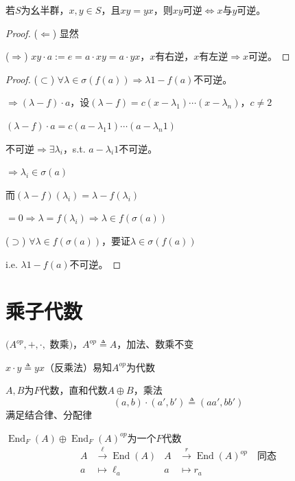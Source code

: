\documentclass[lang=cn,a4paper,newtx,section]{elegantbook}
\begin{document}
\begin{remark}
  若$S$为幺半群，$x, y \in S$，且$xy = yx$，则$xy$可逆$\Longleftrightarrow x$与$y$可逆。
\end{remark}

\begin{proof}
  ($\Leftarrow$) 显然
  
  ($\Rightarrow$) $xy \cdot a := e = a \cdot xy = a \cdot yx$，$x$有右逆，$x$有左逆$\Rightarrow x$可逆。
\end{proof}

\begin{proof}
  ($\subset$) $\forall \lambda \in \sigma(f(a)) \Rightarrow \lambda 1 - f(a)$不可逆。
  
  $\Rightarrow (\lambda - f) \cdot a$，设$(\lambda - f) = c(x - \lambda_1) \cdots (x - \lambda_n)$，$c \neq 2$
  
  $(\lambda - f) \cdot a = c(a - \lambda_1 1) \cdots (a - \lambda_n 1)$
  
  不可逆$\Rightarrow \exists \lambda_i$，s.t. $a - \lambda_i 1$不可逆。
  
  $\Rightarrow \lambda_i \in \sigma(a)$
  
  而$(\lambda - f)(\lambda_i) = \lambda - f(\lambda_i)$
  
  $= 0 \Rightarrow \lambda = f(\lambda_i) \Rightarrow \lambda \in f(\sigma(a))$
  
  ($\supset$) $\forall \lambda \in f(\sigma(a))$，要证$\lambda \in \sigma(f(a))$
  
  i.e. $\lambda 1 - f(a)$不可逆。
\end{proof}

\section{乘子代数}

$(A^{op}, +, \cdot,$ 数乘$)$，$A^{op} \triangleq A$，加法、数乘不变
  
$x \cdot y \triangleq yx$（反乘法）易知$A^{op}$为代数


$A, B$为$F$代数，直和代数$A \oplus B$，乘法
\begin{equation*}
  (a, b) \cdot (a', b') \triangleq (aa', bb')
\end{equation*}
满足结合律、分配律

\begin{definition}
  $\operatorname{End}_F(A) \oplus \operatorname{End}_F(A)^{op}$为一个$F$代数
  \begin{align*}
    A &\xrightarrow{\ell} \operatorname{End}(A) & A &\xrightarrow{r} \operatorname{End}(A)^{op} \quad \text{同态}\\
    a &\longmapsto \ell_a & a &\longmapsto r_a
  \end{align*}
\end{definition}
\end{document}
